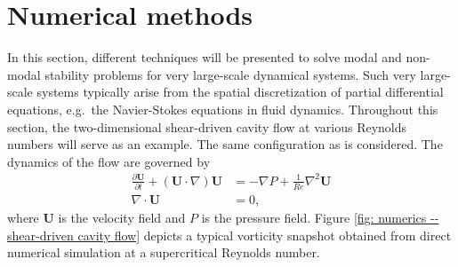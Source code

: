\section{Numerical methods}
\label{sec: numerics}

In this section, different techniques will be presented to solve modal and non-modal stability problems for very large-scale dynamical systems. Such very large-scale systems typically arise from the spatial discretization of partial differential equations, e.g.\ the Navier-Stokes equations in fluid dynamics. Throughout this section, the two-dimensional shear-driven cavity flow at various Reynolds numbers will serve as an example. The same configuration as \cite{jfm:sipp:2007} is considered. The dynamics of the flow are governed by
\begin{equation}
  \begin{aligned}
    \displaystyle \frac{\partial \mathbf{U}}{\partial t} + \left( \mathbf{U} \cdot \nabla \right) \mathbf{U} & = - \nabla P + \frac{1}{Re} \nabla^2 \mathbf{U} \\
    \nabla \cdot \mathbf{U} & = 0,
  \end{aligned}
  \label{eq: numerics -- Navier-Stokes equations}
\end{equation}
where $\mathbf{U}$ is the velocity field and $P$ is the pressure field. Figure \ref{fig: numerics -- shear-driven cavity flow} depicts a typical vorticity snapshot obtained from direct numerical simulation at a supercritical Reynolds number.

